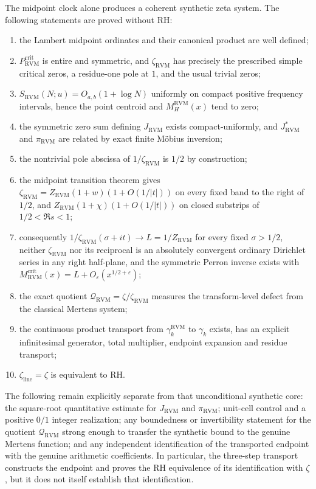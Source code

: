 \documentclass[11pt,reqno]{amsart}
\theoremstyle{definition}
\theoremstyle{remark}
\newcommand{\RVM}{\mathrm{RVM}}
\newcommand{\crit}{\mathrm{crit}}
\newcommand{\linez}{\mathrm{line}}
\begin{document}
The midpoint clock alone produces a coherent synthetic zeta system.  The following statements are proved without RH:
\begin{enumerate}[label=\textup{(\arabic*)}]
\item the Lambert midpoint ordinates and their canonical product are well defined;
\item $P_{\RVM}^{\crit}$ is entire and symmetric, and $\zeta_{\RVM}$ has precisely the prescribed simple critical zeros, a residue-one pole at $1$, and the usual trivial zeros;
\item $S_{\RVM}(N;u)=O_{a,b}(1+\log N)$ uniformly on compact positive frequency intervals, hence the point centroid and $M_H^{\RVM}(x)$ tend to zero;
\item the symmetric zero sum defining $J_{\RVM}$ exists compact-uniformly, and $J_{\RVM}^{*}$ and $\pi_{\RVM}$ are related by exact finite M\"obius inversion;
\item the nontrivial pole abscissa of $1/\zeta_{\RVM}$ is $1/2$ by construction;
\item the midpoint transition theorem gives $\zeta_{\RVM}=Z_{\RVM}(1+w)(1+O(1/|t|))$ on every fixed band to the right of $1/2$, and $Z_{\RVM}(1+\chi)(1+O(1/|t|))$ on closed substrips of $1/2<\Re s<1$;
\item consequently $1/\zeta_{\RVM}(\sigma+it)\to L=1/Z_{\RVM}$ for every fixed $\sigma>1/2$, neither $\zeta_{\RVM}$ nor its reciprocal is an absolutely convergent ordinary Dirichlet series in any right half-plane, and the symmetric Perron inverse exists with
$M_{\RVM}^{\crit}(x)=L+O_\varepsilon(x^{1/2+\varepsilon})$;
\item the exact quotient $\mathcal Q_{\RVM}=\zeta/\zeta_{\RVM}$ measures the transform-level defect from the classical Mertens system;
\item the continuous product transport from $\gamma_k^{\RVM}$ to $\gamma_k$ exists, has an explicit infinitesimal generator, total multiplier, endpoint expansion and residue transport;
\item $\zeta_{\linez}=\zeta$ is equivalent to RH.
\end{enumerate}

The following remain explicitly separate from that unconditional synthetic core: the square-root quantitative estimate for $J_{\RVM}$ and $\pi_{\RVM}$; unit-cell control and a positive $0/1$ integer realization; any boundedness or invertibility statement for the quotient $\mathcal Q_{\RVM}$ strong enough to transfer the synthetic bound to the genuine Mertens function; and any independent identification of the transported endpoint with the genuine arithmetic coefficients.  In particular, the three-step transport constructs the endpoint and proves the RH equivalence of its identification with $\zeta$, but it does not itself establish that identification.
\end{document}
